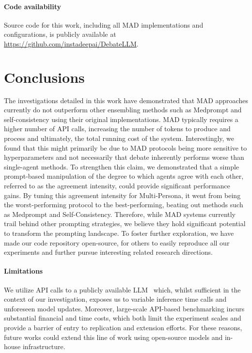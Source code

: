 \documentclass{article}  %
\begin{document}
\paragraph{Code availability} Source code for this work, including all MAD implementations and configurations, is publicly available at \url{https://github.com/instadeepai/DebateLLM}.

\section{Conclusions} \label{sec:conclusion}
The investigations detailed in this work have demonstrated that MAD approaches currently do not outperform other ensembling methods such as Medprompt and self-consistency using their original implementations. 
MAD typically requires a higher number of API calls, increasing the number of tokens to produce and process and ultimately, the total running cost of the system. Interestingly, we found that this might primarily be due to MAD protocols being more sensitive to hyperparameters and not necessarily that debate inherently performs worse than single-agent methods.
To strengthen this claim, we demonstrated that a simple prompt-based manipulation of the degree to which agents agree with each other, referred to as the agreement intensity, could provide significant performance gains. By tuning this agreement intensity for Multi-Persona, it went from being the worst-performing protocol to the best-performing, beating out methods such as Medprompt and Self-Consistency.  
Therefore, while MAD systems currently trail behind other prompting strategies, we believe they hold significant potential to transform the prompting landscape. To foster further exploration, we have made our code repository open-source, for others to easily reproduce all our experiments and further pursue interesting related research directions.
\paragraph{Limitations} We utilize API calls to a publicly available LLM~\citep{brown2020language} which, whilst sufficient in the context of our investigation, exposes us to variable inference time calls and unforeseen model updates. Moreover, large-scale API-based benchmarking incurs substantial financial and time costs, which both limit the experiment scales and provide a barrier of entry to replication and extension efforts.  For these reasons, future works could extend this line of work using open-source models and in-house infrastructure.
\end{document}
